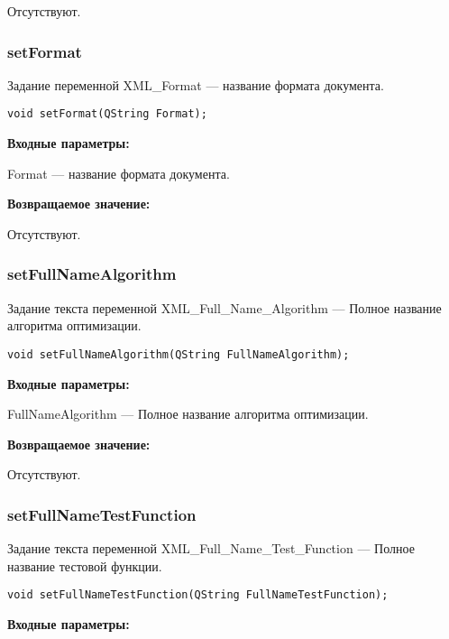 \documentclass[a4paper,12pt]{article}
\begin{document}
Отсутствуют.


\subsubsection{setFormat}\label{setFormat}

Задание переменной XML\_Format --- название формата документа.


\begin{lstlisting}[label=code_syntax_setFormat,caption=Синтаксис]
void setFormat(QString Format);
\end{lstlisting}

\textbf{Входные параметры:}

Format --- название формата документа.

\textbf{Возвращаемое значение:}

Отсутствуют.


\subsubsection{setFullNameAlgorithm}\label{setFullNameAlgorithm}

Задание текста переменной  XML\_Full\_Name\_Algorithm --- Полное название алгоритма оптимизации.


\begin{lstlisting}[label=code_syntax_setFullNameAlgorithm,caption=Синтаксис]
void setFullNameAlgorithm(QString FullNameAlgorithm);
\end{lstlisting}

\textbf{Входные параметры:}

FullNameAlgorithm --- Полное название алгоритма оптимизации.

\textbf{Возвращаемое значение:}

Отсутствуют.


\subsubsection{setFullNameTestFunction}\label{setFullNameTestFunction}

Задание текста переменной  XML\_Full\_Name\_Test\_Function --- Полное название тестовой функции.


\begin{lstlisting}[label=code_syntax_setFullNameTestFunction,caption=Синтаксис]
void setFullNameTestFunction(QString FullNameTestFunction);
\end{lstlisting}

\textbf{Входные параметры:}
\end{document}
